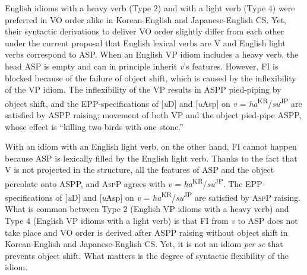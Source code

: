 \ea\label{ex:123}
\z

English idioms with a heavy verb (Type 2) and with a light verb (Type 4) were preferred in \ac{VO} order alike in Korean-English and Japanese-English \ac{CS}. Yet, their syntactic derivations to deliver \ac{VO} order slightly differ from each other under the current proposal that English lexical verbs are V and English light verbs correspond to \ac{ASP}. When an English \acs{VP} idiom includes a heavy verb, the head \ac{ASP} is empty and can in principle inherit \textit{v}’s features. However, \ac{FI} is blocked because of the failure of object shift, which is caused by the inflexibility of the \acs{VP} idiom. The inflexibility of the \acs{VP} results in \ac{ASP}P pied-piping by object shift, and the \ac{EPP}-specifications of [\textit{u}D] and [\textit{u}Asp] on \textit{v} = \textit{ha}\textsuperscript{\MakeUppercase{kr}}/\textit{su}\textsuperscript{\MakeUppercase{jp}}\MakeUppercase{} are satisfied by \ac{ASP}P raising; movement of both \acs{VP} and the object pied-pipe \ac{ASP}P, whose effect is ``killing two birds with one stone.''

With an idiom with an English light verb, on the other hand, \ac{FI} cannot happen because \ac{ASP} is lexically filled by the English light verb. Thanks to the fact that V is not projected in the structure, all the features of \ac{ASP} and the object percolate onto \ac{ASP}P, and A\textsc{spP} agrees with \textit{v} = \textit{ha}\textsuperscript{\MakeUppercase{kr}}/\textit{su}\textsuperscript{\MakeUppercase{jp}}\MakeUppercase{.} The \ac{EPP}-specifications of [\textit{u}D] and [\textit{u}Asp] on \textit{v} = \textit{ha}\textsuperscript{\MakeUppercase{kr}}/\textit{su}\textsuperscript{\MakeUppercase{jp}}\MakeUppercase{} are satisfied by A\textsc{spP} raising. What is common between Type 2 (English \acs{VP} idioms with a heavy verb) and Type 4 (English \acs{VP} idioms with a light verb) is that \ac{FI} from \textit{v} to \ac{ASP} does not take place and \ac{VO} order is derived after \ac{ASP}P raising without object shift in Korean-English and Japanese-English \ac{CS}. Yet, it is not an idiom \textit{per} \textit{se} that prevents object shift. What matters is the degree of syntactic flexibility of the idiom. 

